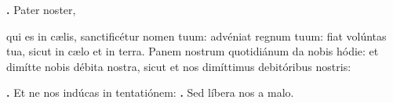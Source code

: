\textbf{\Vbar.} Pater noster, 

\begin{footnotesize}qui es in cælis, sanctificétur nomen tuum: advéniat regnum tuum: fiat volúntas tua, sicut in cælo et in terra. Panem nostrum quotidiánum da nobis hódie: et dimítte nobis débita nostra, sicut et nos dimíttimus debitóribus nostris:  \end{footnotesize}

\textbf{\Vbar.} Et ne nos indúcas in tentatiónem: \textbf{\Rbar.} Sed líbera nos a malo.



